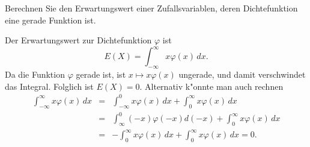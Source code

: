 Berechnen Sie den Erwartungswert einer Zufallsvariablen, deren
Dichtefunktion eine gerade Funktion ist.

\begin{loesung}
Der Erwartungswert zur Dichtefunktion $\varphi$ ist
$$E(X)=\int_{-\infty}^\infty x\varphi(x)\,dx.$$
Da die Funktion $\varphi$ gerade ist, ist $x\mapsto x\varphi(x)$
ungerade, und damit verschwindet das Integral. Folglich ist $E(X)=0$.
Alternativ k"onnte man auch rechnen
\begin{eqnarray*}
\int_{-\infty}^\infty x\varphi(x)\,dx
&=&\int_{-\infty}^0x\varphi(x)\,dx +\int_0^\infty x\varphi(x)\,dx\\
&=&\int_{\infty}^0(-x)\varphi(-x)d(-x)+\int_0^\infty x\varphi(x)\,dx\\
&=&-\int_0^{\infty}x\varphi(x)\,dx+\int_0^\infty x\varphi(x)\,dx=0.\\
\end{eqnarray*}
\end{loesung}

